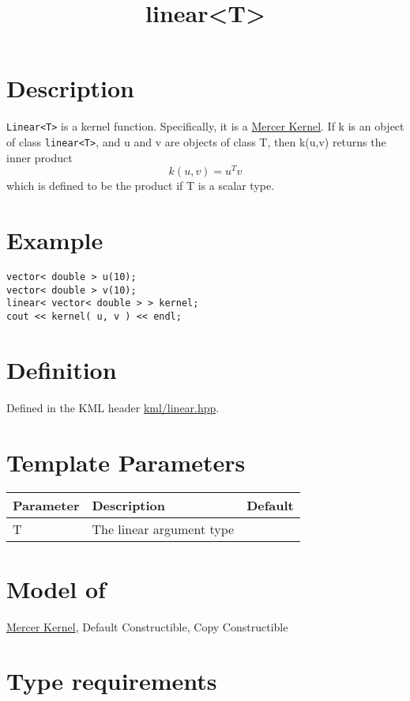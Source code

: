 \documentclass{article}
\begin{document}
\title{linear<T>}
\maketitle

\section*{Description}

\texttt{Linear<T>} is a kernel function. Specifically, it is a \href{\kmlroot/mercer_kernel.html}{Mercer Kernel}.
 If k is an object of class \texttt{linear<T>}, and u and v are objects of class T, then k(u,v) returns the inner product 
%
$$k(u,v) = u^T v $$
%
which is defined to be the product if T is a scalar type. 


\section*{Example}

\highlightcpp{}
\begin{verbatim}
vector< double > u(10);
vector< double > v(10);
linear< vector< double > > kernel;
cout << kernel( u, v ) << endl;
\end{verbatim}


\section*{Definition}

Defined in the KML header \href{\kmlsvnroot/kml/linear.hpp}{kml/linear.hpp}.


\section*{Template Parameters}

\begin{tabular}{lll}
\textbf{Parameter} & \textbf{Description} & \textbf{Default} \\ 
\hline
T & The linear argument type \\ 
\end{tabular}


\section*{Model of}

\href{\kmlroot/mercer_kernel.html}{Mercer Kernel}, 
Default Constructible, Copy Constructible

\section*{Type requirements}
\end{document}
